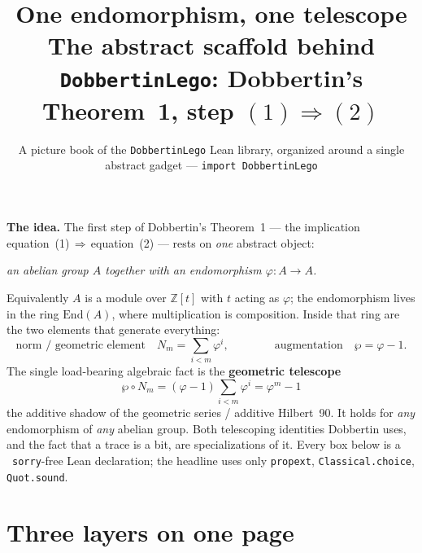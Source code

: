 \documentclass[11pt]{article}
\title{\vspace{-1.5cm}\textbf{One endomorphism, one telescope}\\[4pt]
\large The abstract scaffold behind \texttt{DobbertinLego}: Dobbertin's Theorem~1,
step $(1)\Rightarrow(2)$}
\author{\small A picture book of the \texttt{DobbertinLego} Lean library, organized
around a single abstract gadget --- \texttt{import DobbertinLego}}
\date{}
\newcommand{\ck}{\textcolor{grn}{\checkmark}}
\newcommand{\lc}[1]{\texttt{\small #1}}
\newcommand{\phiop}{\varphi}
\begin{document}
\maketitle
\vspace{-1.0cm}

\begin{note}
\textbf{The idea.} The first step of Dobbertin's Theorem~1 --- the implication
equation~(1)\,$\Rightarrow$\,equation~(2) --- rests on \emph{one} abstract object:
\begin{center}\itshape
an abelian group $A$ together with an endomorphism $\phiop : A\to A$.
\end{center}
Equivalently $A$ is a module over $\mathbb{Z}[t]$ with $t$ acting as $\phiop$; the
endomorphism lives in the ring $\mathrm{End}(A)$, where multiplication is
composition. Inside that ring are the two elements that generate everything:
\[
  \text{norm / geometric element}\quad N_m=\sum_{i<m}\phiop^i,
  \qquad\qquad
  \text{augmentation}\quad \wp=\phiop-1 .
\]
The single load-bearing algebraic fact is the \textbf{geometric telescope}
\[
  \boxed{\ \wp\circ N_m=(\phiop-1)\sum_{i<m}\phiop^{i}=\phiop^{m}-1\ }
\]
the additive shadow of the geometric series / additive Hilbert~90. It holds for
\emph{any} endomorphism of \emph{any} abelian group. Both telescoping identities
Dobbertin uses, and the fact that a trace is a bit, are specializations of it.
Every box below is a \ck\ \lc{sorry}-free Lean declaration; the headline uses only
\lc{propext}, \lc{Classical.choice}, \lc{Quot.sound}.
\end{note}

\section*{Three layers on one page}
\end{document}
